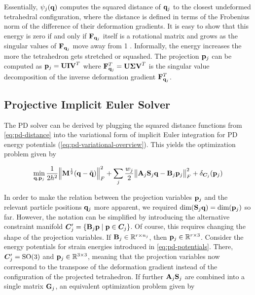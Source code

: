 \noindent Essentially, $\psi_j(\mathbf{q})$ computes the squared distance of $\mathbf{q}_j$ to the closest undeformed tetrahedral configuration, 
where the distance is defined in terms of the Frobenius norm of the difference of their deformation gradients. It is easy to 
show that this energy is zero if and only if $\mathbf{F}_{\mathbf{q}_j}$ itself is a rotational matrix and grows as the 
singular values of $\mathbf{F}_{\mathbf{q}_j}$ move away from 1 \cite{bouaziz2014}. Informally, the energy increases the more the tetrahedron gets 
stretched or squashed. The projection $\mathbf{p}_j$ can be computed as $\mathbf{p}_j = \mathbf{UIV}^T$ where $\mathbf{F}^T_{\mathbf{q}_j} = 
\mathbf{U \Sigma V}^T$ is the singular value decomposition of the inverse deformation gradient $\mathbf{F}^T_{\mathbf{q}_j}$.

\subsection{Projective Implicit Euler Solver}\label{ss:pd-solver}
The PD solver can be derived by plugging the squared distance functions from \autoref{eq:pd-distance} into the variational 
form of implicit
Euler integration for PD energy potentials (\cref{eq:pd-variational-overview}). This yields the optimization problem given by 

\begin{equation}\label{eq:pd-variational}
    \min_{\mathbf{q}, \mathbf{p}_j} \frac{1}{2h^2} \norm{\mathbf{M}^{\frac{1}{2}}(\mathbf{q} - \tilde{\mathbf{q}})}^2_F + 
    \sum_j \frac{w_j}{2} \norm{\mathbf{A}_j\mathbf{S}_j\mathbf{q} - \mathbf{B}_j\mathbf{p}_j}^2_F + \delta_{\bm{C}_j}(\mathbf{p}_j)
\end{equation}

\noindent In order to make the relation between the projection variables $\mathbf{p}_j$ and the relevant particle positions 
$\mathbf{q}_j$ more apparent, we required $\text{dim}(\mathbf{S}_j\mathbf{q}) = \text{dim}(\mathbf{p}_j)$ so far. However, the 
notation can be simplified by introducing the alternative constraint manifold $\bm{C}^\prime_j = \{ \mathbf{B}_j\mathbf{p} 
\mid \mathbf{p} \in \bm{C}_j \}$. Of course, this requires changing the shape of the projection variables. If 
$\mathbf{B}_j \in \mathbb{R}^{r \times n_j}$, then $\mathbf{p}_j \in \mathbb{R}^{r \times 3}$. Consider the energy 
potentials for strain energies introduced in \cref{eq:pd-potentials}. There, $\bm{C}^\prime_j = \text{SO}(3)$ 
and $\mathbf{p}_j \in \mathbb{R}^{3 \times 3}$, meaning that the projection variables now correspond to the transpose 
of the deformation gradient 
instead of the configuration of the projected tetrahedron. If further $\mathbf{A}_j\mathbf{S}_j$ are combined into a single 
matrix $\mathbf{G}_j$, an equivalent optimization problem given by 

